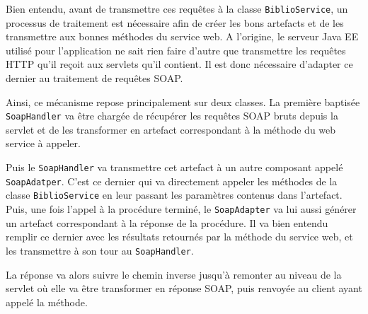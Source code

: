 Bien entendu, avant de transmettre ces requêtes à la classe \verb|BiblioService|, un processus de traitement est nécessaire afin de créer les bons artefacts et de les transmettre aux bonnes méthodes du service web. A l’origine, le serveur Java EE utilisé pour l’application ne sait rien faire d’autre que transmettre les requêtes HTTP qu’il reçoit aux servlets qu’il contient. Il est donc nécessaire d’adapter ce dernier au traitement de requêtes SOAP.

Ainsi, ce mécanisme repose principalement sur deux classes. La première baptisée \verb|SoapHandler| va être chargée de récupérer les requêtes SOAP bruts depuis la servlet et de les transformer en artefact correspondant à la méthode du web service à appeler.

Puis le \verb|SoapHandler| va transmettre cet artefact à un autre composant appelé \verb|SoapAdatper|. C’est ce dernier qui va directement appeler les méthodes de la classe \verb|BiblioService| en leur passant les paramètres contenus dans l’artefact. Puis, une fois l’appel à la procédure terminé, le \verb|SoapAdapter| va lui aussi générer un artefact correspondant à la réponse de la procédure. Il va bien entendu remplir ce dernier avec les résultats retournés par la méthode du service web, et les transmettre à son tour au \verb|SoapHandler|.

La réponse va alors suivre le chemin inverse jusqu’à remonter au niveau de la servlet où elle va être transformer en réponse SOAP, puis renvoyée au client ayant appelé la méthode.


 


